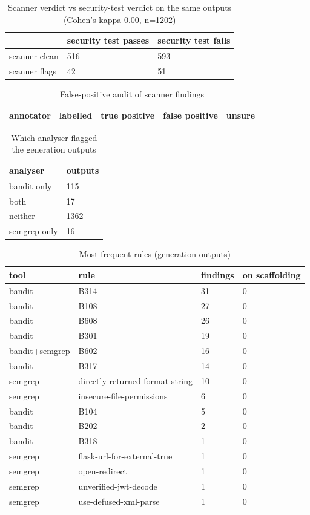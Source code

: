 \begin{table}[t]\centering\small
\caption{Scanner verdict vs security-test verdict on the same outputs (Cohen's kappa 0.00, n=1202)}
\begin{tabular}{lll}
\toprule
 & security test passes & security test fails \\
\midrule
scanner clean & 516 & 593 \\
scanner flags & 42 & 51 \\
\bottomrule
\end{tabular}
\end{table}
\begin{table}[t]\centering\small
\caption{False-positive audit of scanner findings}
\begin{tabular}{lllll}
\toprule
annotator & labelled & true positive & false positive & unsure \\
\midrule
\bottomrule
\end{tabular}
\end{table}
\begin{table}[t]\centering\small
\caption{Which analyser flagged the generation outputs}
\begin{tabular}{ll}
\toprule
analyser & outputs \\
\midrule
bandit only & 115 \\
both & 17 \\
neither & 1362 \\
semgrep only & 16 \\
\bottomrule
\end{tabular}
\end{table}
\begin{table}[t]\centering\small
\caption{Most frequent rules (generation outputs)}
\begin{tabular}{llll}
\toprule
tool & rule & findings & on scaffolding \\
\midrule
bandit & B314 & 31 & 0 \\
bandit & B108 & 27 & 0 \\
bandit & B608 & 26 & 0 \\
bandit & B301 & 19 & 0 \\
bandit+semgrep & B602 & 16 & 0 \\
bandit & B317 & 14 & 0 \\
semgrep & directly-returned-format-string & 10 & 0 \\
semgrep & insecure-file-permissions & 6 & 0 \\
bandit & B104 & 5 & 0 \\
bandit & B202 & 2 & 0 \\
bandit & B318 & 1 & 0 \\
semgrep & flask-url-for-external-true & 1 & 0 \\
semgrep & open-redirect & 1 & 0 \\
semgrep & unverified-jwt-decode & 1 & 0 \\
semgrep & use-defused-xml-parse & 1 & 0 \\
\bottomrule
\end{tabular}
\end{table}
